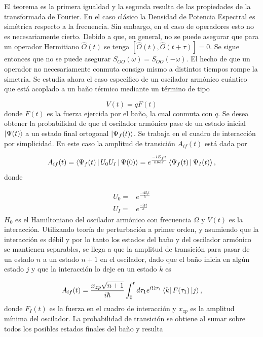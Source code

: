 \documentclass[10pt,a4paper]{report}
\begin{document}
El teorema es la primera igualdad y la segunda resulta de las propiedades de la transformada de Fourier. En el caso clásico la Densidad de Potencia Espectral es simétrica respecto a la frecuencia. Sin embargo, en el caso de operadores esto no es necesariamente cierto. Debido a que, en general, no se puede asegurar que para un operador Hermitiano $\hat{O}(t)$ se tenga $[\hat{O}(t),\hat{O}(t+\tau)] = 0$. Se sigue entonces que no se puede asegurar $S_{OO}(\omega) = S_{OO}(-\omega)$. El hecho de que un operador no necesariamente conmuta consigo mismo a distintos tiempos rompe la simetría. Se estudia ahora el caso específico de un oscilador armónico cuántico que está acoplado a un baño térmico mediante un término de tipo

\begin{equation}
V(t) = qF(t)
\end{equation} donde $F(t)$ es la fuerza ejercida por el baño, la cual conmuta con $q$. Se desea obtener la probabilidad de que el oscilador armónico pase de un estado inicial $\Ket{\Psi(t)}$  a un estado final ortogonal $\Ket{\Psi_f(t)}$. Se trabaja en el cuadro de interacción por simplicidad. En este caso la amplitud de transición $A_{if}(t)$ está dada por

\begin{equation}
A_{if}(t) =  \Braket{\Psi_f(t)|U_0 U_I|\Psi(0)}= e^{\frac{-i E_f t}{hbar}} \Braket{\Psi_f(t)|\Psi_I(t)} ,
\end{equation} donde

\begin{align}
U_0 =& e^{\frac{-i H_0 t}{\hbar}}\\
U_I =& e^{\frac{-i V t}{\hbar}}
\end{align} $H_0$ es el Hamiltoniano del oscilador armónico con frecuencia $\Omega$ y $V(t)$ es la interacción. Utilizando teoría de perturbación a primer orden, y asumiendo que la interacción es débil y por lo tanto los estados del baño y del oscilador armónico se mantienen separables, se llega a que la amplitud de transición para pasar de un estado $n$ a un estado $n+1$ en el oscilador, dado que el baño inicia en algún estado $j$ y que la interacción lo deje en un estado $k$ es

\begin{equation}
A_{if}(t) = \frac{x_{zp}\sqrt{n+1}}{i\hbar}\int_0^t d\tau_1 e^{i\Omega \tau_1} \Bra{k}F(\tau_1)\Ket{j},
\end{equation} donde $F_I(t)$ es la fuerza en el cuadro de interacción y $x_{zp}$ es la amplitud mínima del oscilador. La probabilidad de transición se obtiene al sumar sobre todos los posibles estados finales del baño y resulta
\end{document}

